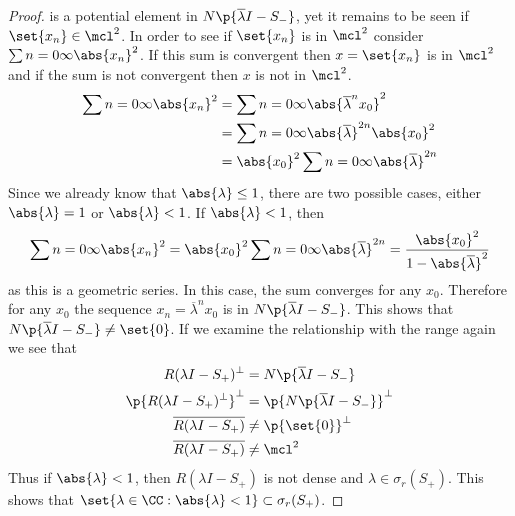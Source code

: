 \documentclass[11pt, oneside]{article}
\begin{document}
\begin{enumerate}
\begin{enumerate}
\begin{proof}
          is a potential element in $N\p{\overline{\lambda}I - S_-}$, yet it
          remains to be seen if $\set{x_n} \in \mcl^2$.
          In order to see if $\set{x_n}$ is in $\mcl^2$ consider
          $\sum{n = 0}{\infty}{\abs{x_n}^2}$.
          If this sum is convergent then $x = \set{x_n}$ is in $\mcl^2$ and if
          the sum is not convergent then $x$ is not in $\mcl^2$.
          \begin{align*}
            \sum{n = 0}{\infty}{\abs{x_n}^2} &= \sum{n = 0}{\infty}{\abs{\overline{\lambda}^n x_0}^2} \\
            &= \sum{n = 0}{\infty}{\abs{\overline{\lambda}}^{2n} \abs{x_0}^2} \\
            &= \abs{x_0}^2 \sum{n = 0}{\infty}{\abs{\overline{\lambda}}^{2n}} \\
          \end{align*}
          Since we already know that $\abs{\lambda} \le 1$, there are two
          possible cases, either $\abs{\lambda} = 1$ or $\abs{\lambda} < 1$.
          If $\abs{\lambda} < 1$, then
          \[
            \sum{n = 0}{\infty}{\abs{x_n}^2} = \abs{x_0}^2 \sum{n = 0}{\infty}{\abs{\overline{\lambda}}^{2n}}
            = \frac{\abs{x_0}^2}{1 - \abs{\overline{\lambda}}^2}
          \]
          as this is a geometric series.
          In this case, the sum converges for any $x_0$.
          Therefore for any $x_0$ the sequence $x_n = \overline{\lambda}^n x_0$
          is in $N\p{\overline{\lambda}I - S_-}$.
          This shows that $N\p{\overline{\lambda}I - S_-} \neq \set{0}$.
          If we examine the relationship with the range again we see that
          \begin{align*}
            R(\lambda I - S_+)^{\perp} &= N\p{\overline{\lambda}I - S_-} \\
            \p{R(\lambda I - S_+)^{\perp}}^{\perp} &= \p{N\p{\overline{\lambda}I - S_-}}^{\perp} \\
            \overline{R(\lambda I - S_+)} &\neq \p{\set{0}}^{\perp} \\
            \overline{R(\lambda I - S_+)} &\neq \mcl^2 \\
          \end{align*}
          Thus if $\abs{\lambda} < 1$, then $R(\lambda I - S_+)$ is not dense
          and $\lambda \in \sigma_r(S_+)$.
          This shows that
          $\set{\lambda \in \CC: \abs{\lambda} < 1} \subset \sigma_r(S_+)$.


\end{proof}
\end{enumerate}
\end{enumerate}
\end{document}
